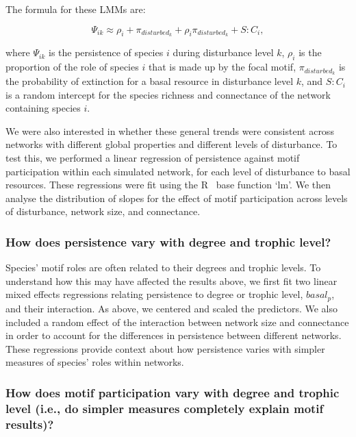 \documentclass[12pt]{article}
\begin{document}
\begin{spacing}{2.0}
            The formula for these LMMs are:       
            
            \begin{equation}
                \Psi_{ik} \approx \rho_{i} + \pi_{disturbed_k} + \rho_{i}\pi_{disturbed_k} +
                S:C_{i} ,
                \label{propreq}
            \end{equation}


            where $\Psi_{ik}$ is the persistence of species $i$ during disturbance level $k$, $\rho_{i}$ is the proportion of the role of species $i$ that is made up by the focal motif, $\pi_{disturbed_k}$ is the probability of extinction for a basal resource in disturbance level $k$, and $S:C_{i}$ is a random intercept for the species richness and connectance of the network containing species $i$.
    
            We were also interested in whether these general trends were consistent across networks with different global properties and different levels of disturbance. 
            To test this, we performed a linear regression of persistence against motif participation within each simulated network, for each level of disturbance to basal resources.
            These regressions were fit using the R~\citep{R} base function `lm'.
            We then analyse the distribution of slopes for the effect of motif participation across levels of disturbance, network size, and connectance. 
        

        \subsubsection*{How does persistence vary with degree and trophic level?}
        
            Species' motif roles are often related to their degrees and trophic levels.
            To understand how this may have affected the results above, we first fit two linear mixed effects regressions relating persistence to degree or trophic level, $basal_p$, and their interaction.
            As above, we centered and scaled the predictors.
            We also included a random effect of the interaction between network size and connectance in order to account for the differences in persistence between different networks. 
            These regressions provide context about how persistence varies with simpler measures of species' roles within networks.
                    
        
        \subsubsection*{How does motif participation vary with degree and trophic level (i.e., do simpler measures completely explain motif results)?}


\end{spacing}
\end{document}
